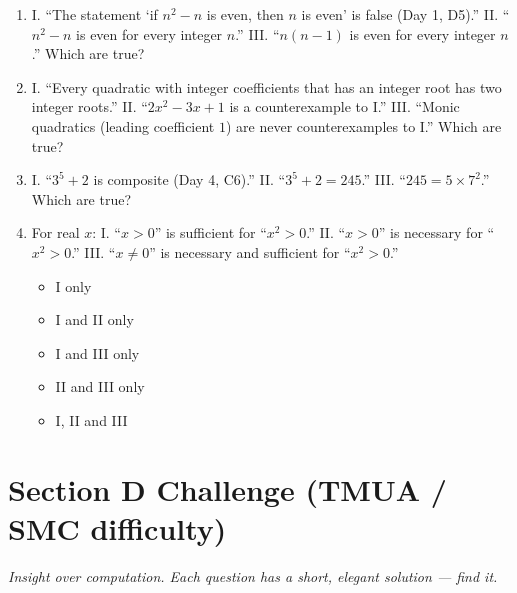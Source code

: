 \documentclass[11pt,a4paper]{article}
\begin{document}
\begin{enumerate}
\item I. ``The statement `if $n^2-n$ is even, then $n$ is even' is false (Day 1, D5).'' II. ``$n^2-n$ is even for every integer $n$.'' III. ``$n(n-1)$ is even for every integer $n$.'' Which are true?

\item I. ``Every quadratic with integer coefficients that has an integer root has two integer roots.'' II. ``$2x^2-3x+1$ is a counterexample to I.'' III. ``Monic quadratics (leading coefficient $1$) are never counterexamples to I.'' Which are true?

\item I. ``$3^5+2$ is composite (Day 4, C6).'' II. ``$3^5+2=245$.'' III. ``$245=5\times7^2$.'' Which are true?

\item For real $x$: I. ``$x>0$'' is sufficient for ``$x^2>0$.'' II. ``$x>0$'' is necessary for ``$x^2>0$.'' III. ``$x\neq0$'' is necessary and sufficient for ``$x^2>0$.''
\begin{itemize}
\item[A)] I only
\item[B)] I and II only
\item[C)] I and III only
\item[D)] II and III only
\item[E)] I, II and III
\end{itemize}

\end{enumerate}

\section*{Section D \quad Challenge \hfill{\normalfont\small(TMUA / SMC difficulty)}}

\noindent\textit{Insight over computation. Each question has a short, elegant solution --- find it.}
\end{document}
